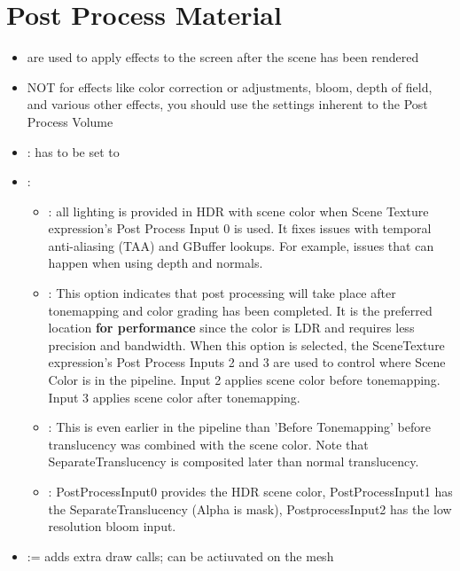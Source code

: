     \section{Post Process Material}
        \begin{itemize}
            \item are used to apply effects to the screen after the scene has been rendered
            \item NOT for effects like color correction or adjustments, bloom, depth of field, and various other effects, you should use the settings inherent to the Post Process Volume
            \item {} : has to be set to 
            \item {}:
            \begin{itemize}
                \item {}:  	
                        all lighting is provided in HDR with scene color when Scene Texture expression's Post Process Input 0
                        is used. It fixes issues with temporal anti-aliasing (TAA) and GBuffer lookups. For example,
                        issues that can happen when using depth and normals.
                \item {}:
                    This option indicates that post processing will take place after tonemapping
                    and color grading has been completed. It is the preferred location \textbf{for performance}
                    since the color is LDR and requires less precision and bandwidth. When this option is selected,
                    the SceneTexture expression's Post Process Inputs 2 and 3 are used to control where
                    Scene Color is in the pipeline.
                    Input 2 applies scene color before tonemapping.
                    Input 3 applies scene color after tonemapping.
                \item {}: This is even earlier in the pipeline than 'Before Tonemapping' before translucency was combined with the scene color. Note that SeparateTranslucency is composited later than normal translucency.
                \item {}: PostProcessInput0 provides the HDR scene color, PostProcessInput1 has the SeparateTranslucency (Alpha is mask), PostprocessInput2 has the low resolution bloom input.
            \end{itemize}
            \item {} := adds extra draw calls; can be actiuvated on the mesh
        \end{itemize}

